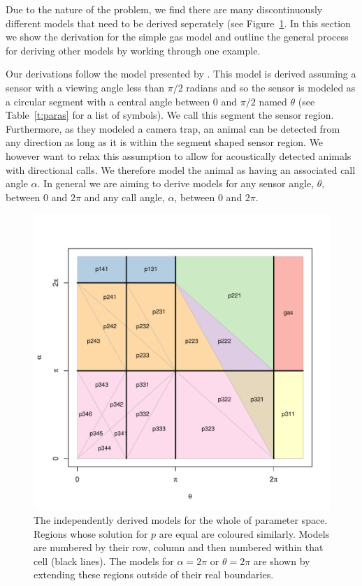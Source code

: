\documentclass[a4paper,10pt,reqno,oneside]{amsart}
\begin{document}
Due to the nature of the problem, we find there are many discontinuously different models that need to be derived seperately (see Figure~\ref{f:regions}. In this section we show the derivation for the simple gas model and outline the general process for deriving other models by working through one example. 

Our derivations follow the model presented by \citep{rowcliffe2008estimating}. This model is derived assuming a sensor with a viewing angle less than $\pi/2$ radians and so the sensor is modeled as a circular segment with a central angle between 0 and  $\pi/2$ named  $\theta$ (see Table~\ref{t:paras} for a list of symbols). We call this segment the sensor region. Furthermore, as they modeled a camera trap, an animal can be detected from any direction as long as it is within the segment shaped sensor region. We however want to relax this assumption to allow for acoustically detected animals with directional calls. We therefore model the animal as having an associated call angle $\alpha$. In general we are aiming to derive models for any sensor angle, $ \theta$, between 0 and $2\pi$ and any call angle, $ \alpha$, between 0 and $2\pi$. 



\begin{figure}
\centering
\includegraphics[width=1\textwidth]{imgs/equalRegions.pdf}
\caption{The independently derived models for the whole of parameter space. Regions whose solution for $p$ are equal are coloured similarly. Models are numbered by their row, column and then numbered within that cell (black lines). The models for $\alpha = 2\pi$ or $\theta =  2\pi$ are shown by extending these regions outside of their real boundaries.}
\label{f:regions}
\end{figure}
\end{document}
